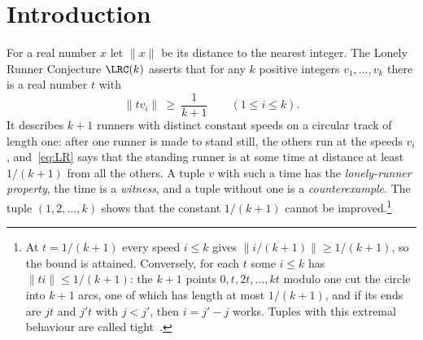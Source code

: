 \section{Introduction}\label{sec:intro}

For a real number $x$ let $\|x\|$ be its distance to the nearest integer.
The Lonely Runner Conjecture $\LRC(k)$ asserts that for any $k$ positive
integers $v_1,\dots,v_k$ there is a real number $t$ with
\begin{equation}\label{eq:LR}
 \|t v_i\|\ \ge\ \frac1{k+1}\qquad(1\le i\le k).
\end{equation}
It describes $k+1$ runners with distinct constant speeds on a circular track
of length one: after one runner is made to stand still, the others run at
the speeds $v_i$, and~\eqref{eq:LR} says that the standing runner is at some
time at distance at least $1/(k+1)$ from all the others. A tuple $v$ with
such a time has the \emph{lonely-runner property}, the time is a
\emph{witness}, and a tuple without one is a \emph{counterexample}. The
tuple $(1,2,\dots,k)$ shows that the constant $1/(k+1)$ cannot be
improved.\footnote{At $t=1/(k+1)$ every speed $i\le k$ gives
$\|i/(k+1)\|\ge 1/(k+1)$, so the bound is attained. Conversely, for each
$t$ some $i\le k$ has $\|ti\|\le 1/(k+1)$: the $k+1$ points
$0,t,2t,\dots,kt$ modulo one cut the circle into $k+1$ arcs, one of which
has length at most $1/(k+1)$, and if its ends are $jt$ and $j't$ with
$j<j'$, then $i=j'-j$ works. Tuples with this extremal behaviour
are called tight~\cite{GW06}.}

